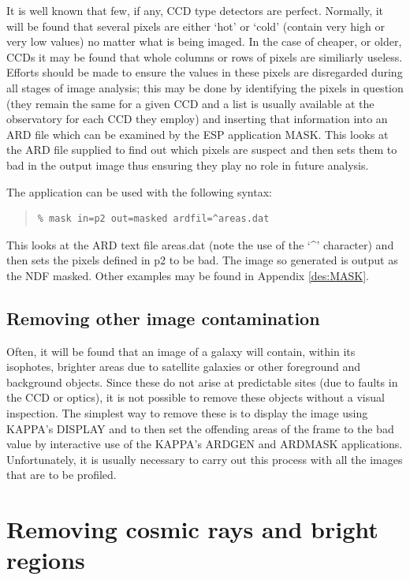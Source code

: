 \documentclass[twoside,11pt]{article}
\newcommand{\xref}[3]{#1}
\newenvironment{myquote}{\begin{quote}\begin{small}}{\end{small}\end{quote}}
\begin{document}
It is well known that few, if any, CCD type detectors are perfect. Normally,
it will be found that several pixels are either `hot' or `cold' (contain very
high or very low values) no matter what is being imaged. In the case of
cheaper, or older, CCDs it may be found that whole columns or rows of pixels
are similiarly useless. Efforts should be made to ensure the values in these
pixels are disregarded during all stages of image analysis; this may
be done by identifying the pixels in question (they remain the same for
a given CCD and a list is usually available at the observatory for
each CCD they employ) and inserting that information into an ARD file
which can be examined by the ESP application MASK. This looks at the
ARD file supplied to find out which pixels are suspect and then sets them
to bad in the output image thus ensuring they play no role in future analysis.

The application can be used with the following syntax:

\begin{myquote}
\begin{verbatim}
% mask in=p2 out=masked ardfil=^areas.dat
\end{verbatim}
\end{myquote}

This looks at the ARD text file areas.dat (note the use of the
`\^{ }' character) and then sets the pixels defined
in p2 to be bad. The image so generated is output as the NDF masked.
Other examples may be found in Appendix \ref{des:MASK}.


\subsection{Removing other image contamination}

Often, it will be found that an image of a galaxy will contain, within its
isophotes, brighter areas due to satellite galaxies or other foreground and
background objects. Since these do not arise at predictable sites (due to faults
in the CCD or optics), it is not possible to remove
these objects without a visual inspection. The simplest way to remove these
is to display the image using \xref{KAPPA}{sun95}{}'s DISPLAY and to then set the offending
areas of the frame to the bad value
by interactive use of the \xref{KAPPA}{sun95}{}'s ARDGEN and ARDMASK applications.
Unfortunately, it is usually necessary to carry out this process with all the
images that are to be profiled.

\section{Removing cosmic rays and bright regions}
\label{sec:removc}
\end{document}
